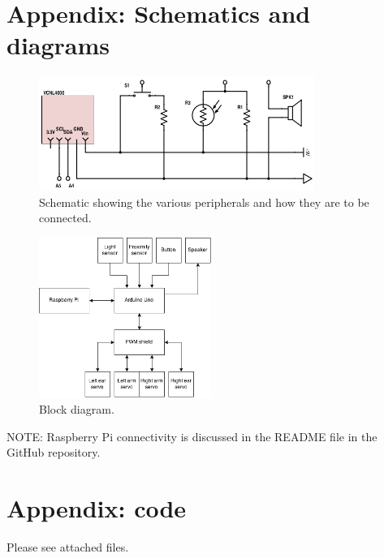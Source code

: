 \documentclass{article}
\begin{document}
\clearpage
\section*{Appendix: Schematics and diagrams}
\begin{figure}[hbt]
    \centering
    \includegraphics[width=0.8\textwidth]{schematic}
    \caption{Schematic showing the various peripherals and how they are to be connected.}
    \label{fig:schematic}
\end{figure}

\begin{figure}[hbt]
    \centering
    \includegraphics[width=0.5\textwidth]{block-diagram}
    \caption{Block diagram.}
    \label{fig:schematic}
\end{figure}

NOTE: Raspberry Pi connectivity is discussed in the README file in the GitHub repository.

\clearpage
\section*{Appendix: code}
Please see attached files.
\end{document}
